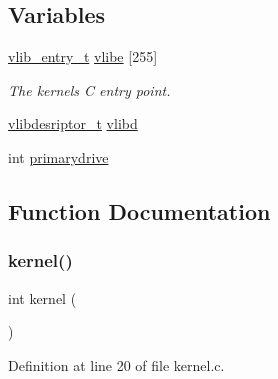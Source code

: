 \subsection*{Variables}
\begin{DoxyCompactItemize}
\item 
\hyperlink{a00158_a97c1a7136f2ab06368e93c2d7533d619_a97c1a7136f2ab06368e93c2d7533d619}{vlib\+\_\+entry\+\_\+t} \hyperlink{a00047_af69f4f709fdab28dec6b8fb75fb4d526_af69f4f709fdab28dec6b8fb75fb4d526}{vlibe} \mbox{[}255\mbox{]}
\begin{DoxyCompactList}\small\item\em The kernels C entry point. \end{DoxyCompactList}\item 
\hyperlink{a00158_a2d9000b4fbb25c5ed2950a2d8f4921d5_a2d9000b4fbb25c5ed2950a2d8f4921d5}{vlibdesriptor\+\_\+t} \hyperlink{a00047_a2125beec541d04796805161dbec05fcf_a2125beec541d04796805161dbec05fcf}{vlibd}
\item 
int \hyperlink{a00047_af37cb131d8a2101addfbf5fb2d8a53b4_af37cb131d8a2101addfbf5fb2d8a53b4}{primarydrive}
\end{DoxyCompactItemize}


\subsection{Function Documentation}
\mbox{\label{a00047_a4ee3d1f05046b7afc6b4d516bf10667a_a4ee3d1f05046b7afc6b4d516bf10667a}} 
\subsubsection{\texorpdfstring{kernel()}{kernel()}}
{\footnotesize\ttfamily int kernel (\begin{DoxyParamCaption}{ }\end{DoxyParamCaption})}



Definition at line 20 of file kernel.\+c.


